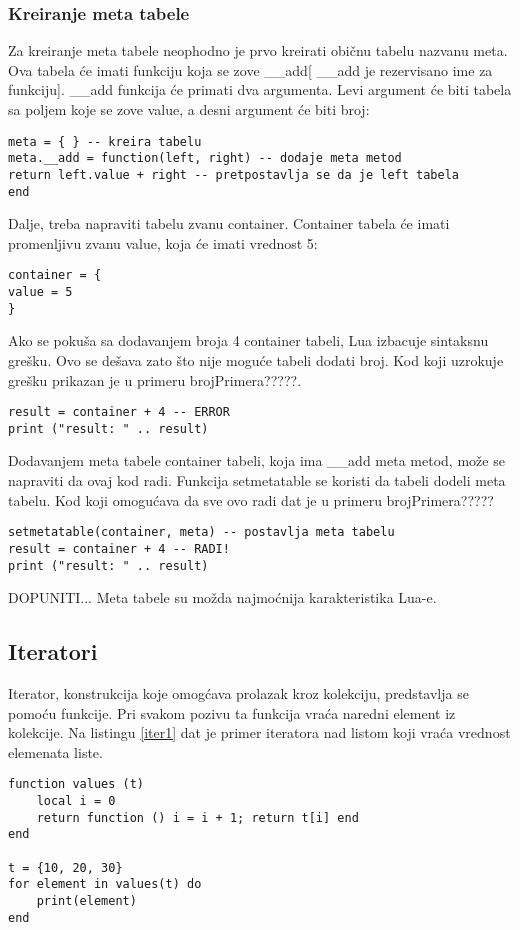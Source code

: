 \documentclass[a4paper]{article}
\begin{document}
\subsubsection{Kreiranje meta tabele}
Za kreiranje meta tabele neophodno je prvo kreirati običnu tabelu nazvanu meta. Ova tabela će imati funkciju koja se zove \_\_add[ \_\_add je rezervisano ime za funkciju]. \_\_add funkcija će primati dva argumenta. Levi argument će biti tabela sa poljem koje se zove value, a desni argument će biti broj:
\begin{verbatim}
meta = { } -- kreira tabelu
meta.__add = function(left, right) -- dodaje meta metod
return left.value + right -- pretpostavlja se da je left tabela
end
\end{verbatim}
Dalje, treba napraviti tabelu zvanu container. Container tabela će imati promenljivu zvanu value, koja će imati vrednost 5:
\begin{verbatim}
container = {
value = 5
}
\end{verbatim}
Ako se pokuša sa dodavanjem broja 4 container tabeli, Lua izbacuje sintaksnu grešku. Ovo se dešava zato što nije moguće tabeli dodati broj. Kod koji uzrokuje grešku prikazan je u primeru brojPrimera?????.
\begin{verbatim}
result = container + 4 -- ERROR
print ("result: " .. result)
\end{verbatim}
Dodavanjem meta tabele container tabeli, koja ima \_\_add meta metod, može se napraviti da ovaj kod radi. Funkcija setmetatable se koristi da tabeli dodeli meta tabelu. Kod koji omogućava da sve ovo radi dat je u primeru brojPrimera?????
\begin{verbatim}
setmetatable(container, meta) -- postavlja meta tabelu
result = container + 4 -- RADI!
print ("result: " .. result)
\end{verbatim}
DOPUNITI... Meta tabele su možda najmoćnija karakteristika Lua-e.


\subsection{Iteratori}

Iterator, konstrukcija koje omogćava prolazak kroz kolekciju, predstavlja se pomoću funkcije. Pri svakom pozivu ta funkcija vraća naredni element iz kolekcije. Na listingu \ref{iter1} dat je primer iteratora nad listom koji vraća vrednost elemenata liste.

\begin{lstlisting}[caption={Primer iteratora nad listom},frame=single, label=iter1]
function values (t)
	local i = 0
	return function () i = i + 1; return t[i] end
end

t = {10, 20, 30}
for element in values(t) do
	print(element)
end
\end{lstlisting}
\end{document}
